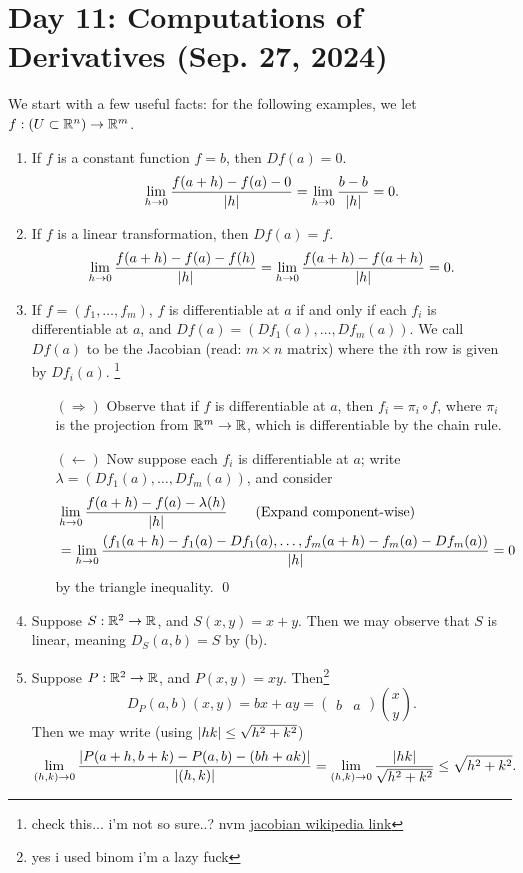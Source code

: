 \section{Day 11: Computations of Derivatives (Sep. 27, 2024)}
We start with a few useful facts: for the following examples, we let $f : (U \subset \mathbb R^n) \to \mathbb R^m$.
\begin{enumerate}[label=(\alph*)]
    \item If $f$ is a constant function $f = b$, then $D f(a) = 0$.
    \[ \lim_{h \to 0} \frac{f(a + h) - f(a) - 0}{\left\lvert h \right\rvert} = \lim_{h \to 0} \frac{b - b}{\left\lvert h \right\rvert} = 0. \]
    \item If $f$ is a linear transformation, then $D f(a) = f$. 
    \[ \lim_{h \to 0} \frac{f(a + h) - f(a) - f(h)}{\left\lvert h \right\rvert} = \lim_{h \to 0} \frac{f(a + h) - f(a + h)}{\left\lvert h \right\rvert} = 0. \]
    \item If $f = (f_1, \dots, f_m)$, $f$ is differentiable at $a$ if and only if each $f_i$ is differentiable at $a$, and $D f(a) = (D f_1(a), \dots, D f_m(a))$. We call $D f(a)$ to be the Jacobian (read: $m \times n$ matrix) where the $i$th row is given by $D f_i(a)$. \footnote{check this... i'm not so sure..? nvm \href{https://en.wikipedia.org/wiki/Jacobian_matrix_and_determinant}{jacobian wikipedia link}}
    \begin{itemize}
        \item[$(\Rightarrow)$] Observe that if $f$ is differentiable at $a$, then $f_i = \pi_i \circ f$, where $\pi_i$ is the projection from $\mathbb R^m \to \mathbb R$, which is differentiable by the chain rule.
        \item[$(\leftarrow)$] Now suppose each $f_i$ is differentiable at $a$; write $\lambda = (Df_1(a), \dots, Df_m(a))$, and consider
        \begin{align*}
            & \lim_{h \to 0} \frac{f(a + h) - f(a) - \lambda(h)}{\left\lvert h \right\rvert} \tag{Expand component-wise} \\
            &= \lim_{h \to 0} \frac{\left(f_1(a + h) - f_1(a) - Df_1(a), \dots, f_m(a + h) - f_m(a) - Df_m(a)\right)}{\left\lvert h \right\rvert} = 0
        \end{align*}
        \[  \]
        by the triangle inequality. \qed
    \end{itemize}
    \item Suppose $S : \mathbb R^2 \to \mathbb R$, and $S(x, y) = x + y$. Then we may observe that $S$ is linear, meaning $D_S(a, b) = S$ by (b).
    \item Suppose $P : \mathbb R^2 \to \mathbb R$, and $P(x, y) = xy$. Then\footnote{yes i used binom i'm a lazy fuck}
    \[ D_P(a, b)(x, y) = bx + ay = \begin{pmatrix} b & a \end{pmatrix} \binom{x}{y}. \]
    Then we may write (using $\left\lvert hk \right\rvert \leq \sqrt{h^2 + k^2}$)
    \[ \lim_{(h, k) \to 0} \frac{\left\lvert P(a + h, b + k) - P(a, b) - (bh + ak) \right\rvert}{\left\lvert (h, k) \right\rvert} = \lim_{(h, k) \to 0} \frac{\left\lvert hk \right\rvert}{\sqrt{h^2 + k^2}} \leq \sqrt{h^2 + k^2}. \]
\end{enumerate}

